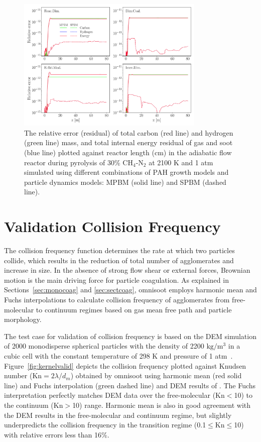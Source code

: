 \begin{figure}[H]
	\centering
	\includegraphics[width=0.8\textwidth]{Figures/Results/Validation/PFR/relerr_pfr.pdf}
	\caption{The relative error (residual) of total carbon (red line) and hydrogen (green line) mass, and total internal energy residual of gas and soot (blue line) plotted against reactor length (cm) in the adiabatic flow reactor during pyrolysis of 30\% $\mathrm{CH_4}$-$\mathrm{N_2}$ at 2100 K and 1 atm simulated using different combinations of PAH growth models and particle dynamics models: MPBM (solid line) and SPBM (dashed line).}
	\label{fig:pfrvalid}
\end{figure}


\section{Validation Collision Frequency}
The collision frequency function determines the rate at which two particles collide, which results in the reduction of total number of agglomerates and increase in size. In the absence of strong flow shear or external forces, Brownian motion is the main driving force for particle coagulation. As explained in Sections~\ref{sec:monocoag} and \ref{sec:sectcoag}, omnisoot employs harmonic mean and Fuchs interpolations to calculate collision frequency of agglomerates from free-molecular to continuum regimes based on gas mean free path and particle morphology. 

The test case for validation of collision frequency is based on the DEM simulation of 2000 monodisperse spherical particles with the density of 2200 $\mathrm{kg/m^3}$ in
a cubic cell with the constant temperature of 298 K and pressure of 1 atm~\citep{goudeli2015coagulation}. Figure~\ref{fig:kernelvalid} depicts the collision frequency plotted against Knudsen number (Kn$=2\lambda/d_m$) obtained by omnisoot using harmonic mean (red solid line) and Fuchs interpolation (green dashed line) and DEM results of \citet{goudeli2015coagulation}. The Fuchs interpretation perfectly matches DEM data over the free-molecular (Kn$<$10) to the continuum (Kn$>$10) range. Harmonic mean is also in good agreement with the DEM results in the free-molecular and continuum regime, but slightly underpredicts the collision frequency in the transition regime (0.1$\le$Kn$\le$10) with relative errors less than 16\%.


